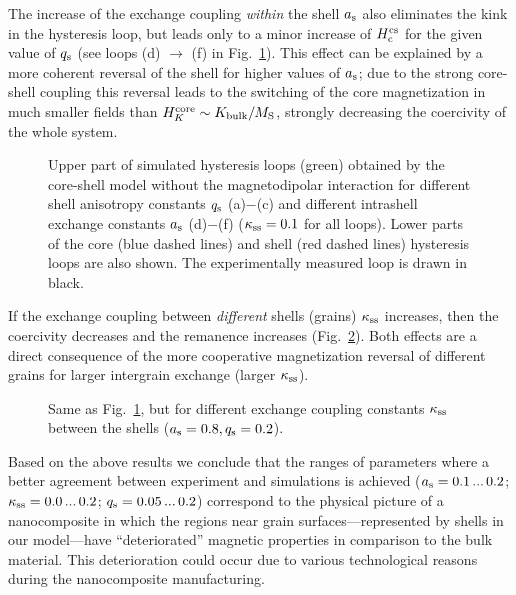 \documentclass[prm,twocolumn,showkeys,preprintnumbers,amsmath,amssymb,superscriptaddress,aps,10pt]{revtex4-1}
\begin{document}
The increase of the exchange coupling {\it within} the shell $a_{\rm s}$ also eliminates the kink in the hysteresis loop, but leads only to a minor increase of $H_{\rm c}^{\rm cs}$ for the given value of $q_{\rm s}$ (see loops (d) $\rightarrow$ (f) in Fig.~\ref{cs_qs-as_selected}). This effect can be explained by a more coherent reversal of the shell for higher values of $a_{\rm s}$; due to the strong core-shell coupling this reversal leads to the switching of the core magnetization in much smaller fields than $H_K^{\rm core} \sim K_{\rm bulk}/M_{\rm S}$, strongly decreasing the coercivity of the whole system. 
\begin{figure}[htb]
\centering
{}
\caption{Upper part of simulated hysteresis loops (green) obtained by the core-shell model without the magnetodipolar interaction for different shell anisotropy constants $q_{\rm s}$ (a)$-$(c) and different intrashell exchange constants $a_{\rm s}$ (d)$-$(f) ($\kappa_{\rm ss} = 0.1$ for all loops). Lower parts of the core (blue dashed lines) and shell (red dashed lines) hysteresis loops are also shown. The experimentally measured loop is drawn in black.}
\label{cs_qs-as_selected}
\end{figure}
If the exchange coupling between {\it different} shells (grains) $\kappa_{\rm ss}$ increases, then the coercivity decreases and the remanence increases (Fig.~\ref{cs_as-kappass_selected}). Both effects are a direct consequence of the more cooperative magnetization reversal of different grains for larger intergrain exchange (larger $\kappa_{\rm ss}$).
\begin{figure}[htb]
\centering
{}
\caption{Same as Fig.~\ref{cs_qs-as_selected}, but for different  exchange coupling constants $\kappa_{\rm ss}$ between the shells ($a_{\rm s} = 0.8, q_{\rm s} = 0.2$).}
\label{cs_as-kappass_selected}
\end{figure}
Based on the above results we conclude that the ranges of parameters where a better agreement between experiment and simulations is achieved ($a_{\rm s} = 0.1 \,...\, 0.2$; $\kappa_{\rm ss} = 0.0 \,...\, 0.2$; $q_{\rm s} = 0.05 \,...\, 0.2$) correspond to the physical picture of a nanocomposite in which the regions near grain surfaces---represented by shells in our model---have ``deteriorated'' magnetic properties in comparison to the bulk material. This deterioration could occur due to various technological reasons during the nanocomposite manufacturing.
\end{document}

